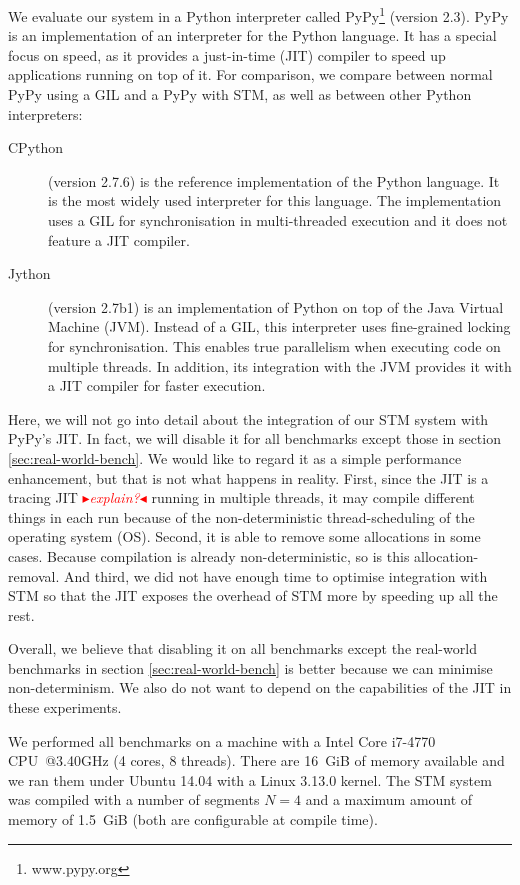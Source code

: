 \documentclass{sigplanconf}
\newcommand{\mynote}[2]{%
  \textcolor{red}{%
    \fbox{\bfseries\sffamily\scriptsize#1}%
    {\small$\blacktriangleright$\textsf{\emph{#2}}$\blacktriangleleft$}%
  }%
}
\newcommand\remi[1]{\mynote{Remi}{#1}}
\begin{document}
We evaluate our system in a Python interpreter called
PyPy\footnote{www.pypy.org} (version 2.3). PyPy is an implementation of an
interpreter for the Python language. It has a special focus on speed,
as it provides a just-in-time (JIT) compiler to speed up applications
running on top of it. For comparison, we compare between normal PyPy
using a GIL and a PyPy with STM, as well as between other Python interpreters:
\begin{description}
\item[CPython] (version 2.7.6) is the reference implementation of the Python
  language. It is the most widely used interpreter for this language.
  The implementation uses a GIL for synchronisation in multi-threaded
  execution and it does not feature a JIT compiler.
\item[Jython] (version 2.7b1) is an implementation of Python on top of
  the Java Virtual Machine (JVM). Instead of a GIL, this interpreter
  uses fine-grained locking for synchronisation. This enables true
  parallelism when executing code on multiple threads. In addition, its
  integration with the JVM provides it with a JIT compiler for faster
  execution.
\end{description}

Here, we will not go into detail about the integration of our STM
system with PyPy's JIT. In fact, we will disable it for all benchmarks
except those in section \ref{sec:real-world-bench}. We would like to
regard it as a simple performance enhancement, but that is not what
happens in reality. First, since the JIT is a tracing
JIT\remi{explain?}  running in multiple threads, it may compile
different things in each run because of the non-deterministic
thread-scheduling of the operating system (OS). Second, it is able to
remove some allocations in some cases. Because compilation is already
non-deterministic, so is this allocation-removal. And third, we did
not have enough time to optimise integration with STM so that the JIT
exposes the overhead of STM more by speeding up all the rest.

Overall, we believe that disabling it on all benchmarks except the
real-world benchmarks in section \ref{sec:real-world-bench} is better
because we can minimise non-determinism. We also do not want to depend
on the capabilities of the JIT in these experiments.

We performed all benchmarks on a machine with a Intel Core i7-4770
CPU~@3.40GHz (4 cores, 8 threads).  There are 16~GiB of memory
available and we ran them under Ubuntu 14.04 with a Linux 3.13.0
kernel. The STM system was compiled with a number of segments $N=4$
and a maximum amount of memory of 1.5~GiB (both are configurable at
compile time).
\end{document}
